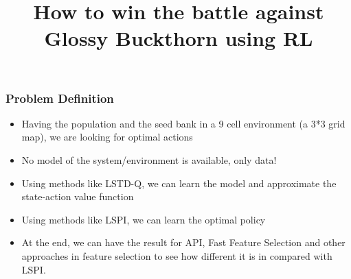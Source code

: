 \documentclass{beamer}
\title{How to win the battle against Glossy Buckthorn using RL}
\date{}
\begin{document}
\begin{frame}
	\maketitle

\end{frame}
\begin{frame}
	\frametitle{Problem Definition}
	\begin{itemize}
		\item Having the population and the seed bank in a 9 cell environment (a 3*3 grid map), we are looking for optimal actions
		\item No model of the system/environment is available, only data!
		\item Using methods like LSTD-Q, we can learn the model and approximate the state-action value function
		\item Using methods like LSPI, we can learn the optimal policy
		\item At the end, we can have the result for API, Fast Feature Selection and other approaches in feature selection to see how different it is in compared with LSPI.
	\end{itemize}

\end{frame}







\end{document}
